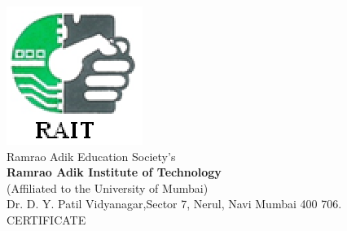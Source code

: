 \cleardoublepage \nonumber
\begin{center}
\includegraphics{raitlogo.eps}\\
Ramrao Adik Education Society's\\
\large {\textbf{Ramrao Adik Institute of Technology}}\\
\small(Affiliated to the University of Mumbai)\\
Dr. D. Y. Patil Vidyanagar,Sector 7, Nerul, Navi Mumbai 400
706.\\\vspace{0.3in} \Large CERTIFICATE
\end{center}
\vspace{0.1in}
